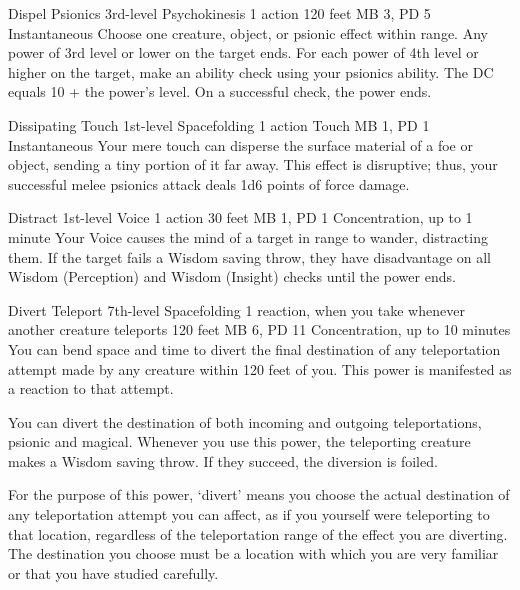 \DndPowerHeader%
  {Dispel Psionics}
  {3rd-level Psychokinesis}
  {1 action}
  {120 feet}
  {MB 3, PD 5}
  {Instantaneous}
  Choose one creature, object, or psionic effect within range.
  Any power of 3rd level or lower on the target ends.
  For each power of 4th level or higher on the target,
  make an ability check using your psionics ability.
  The DC equals 10 + the power's level.
  On a successful check, the power ends.

\DndPowerHeader%
  {Dissipating Touch}
  {1st-level Spacefolding}
  {1 action}
  {Touch}
  {MB 1, PD 1}
  {Instantaneous}
Your mere touch can disperse the surface material of a foe or object,
sending a tiny portion of it far away.
This effect is disruptive; thus,
your successful melee psionics attack deals 1d6 points of force damage.

\DndPowerHeader%
  {Distract}
  {1st-level Voice}
  {1 action}
  {30 feet}
  {MB 1, PD 1}
  {Concentration, up to 1 minute}
Your Voice causes the mind of a target in range to wander,
distracting them.
If the target fails a Wisdom saving throw,
they have disadvantage on all Wisdom (Perception)
and Wisdom (Insight) checks until the power ends.

\DndPowerHeader%
  {Divert Teleport}
  {7th-level Spacefolding}
  {1 reaction, when you take whenever another creature
  teleports}
  {120 feet}
  {MB 6, PD 11}
  {Concentration, up to 10 minutes}
  You can bend space and time to
  divert the final destination of any teleportation attempt
  made by any creature within 120 feet of you.
  This power is manifested as a reaction to that attempt.

  You can divert the destination of both incoming and outgoing
  teleportations,
  psionic and magical.
  Whenever you use this power,
  the teleporting creature makes a Wisdom saving throw.
  If they succeed, the diversion is foiled.
  
  For the purpose of this power,
  `divert' means you choose the actual destination
  of any teleportation attempt you can affect,
  as if you yourself were teleporting to that location,
  regardless of the teleportation range
  of the effect you are diverting.
  The destination you choose must be a location
  with which you are very familiar
  or that you have studied carefully.
  
